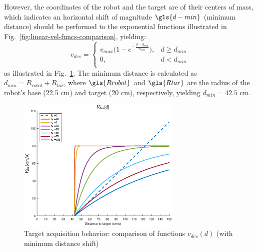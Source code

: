 However, the coordinates of the robot and the target are of their centers of
mass, which indicates an horizontal shift of magnitude $\gls{d-min}$ (minimum
distance) should be performed to the exponential functions illustrated in
Fig.~\ref{fig:linear-vel-funcs-comparison}, yielding:
\begin{equation}
  \label{eq:18} 
v_{des} = \left\{
\begin{array}{ll}
 v_{max} \Big (1 - e^{- \frac{d - d_{min}}{\tau_{vdes}}} \Big ), & d \geq d_{min} \\
      0 , & d < d_{min} \\
\end{array} 
\right.
\end{equation}
as illustrated in Fig.~\ref{fig:linear-vel-funcs-comparison-shift}.
The minimum distance is calculated as $d_{min} = R_{robot} + R_{tar}$, where
$\gls{Rrobot}$ and $\gls{Rtar}$ are the radius of the robot's base (22.5 cm) and
target (20 cm), respectively, yielding $d_{min} = 42.5$ cm.
%
\begin{figure}[!hbt]
\centering
    \includegraphics[width=0.7\textwidth]{./img/linear-vel-funcs-comparison-shift.eps}
  \caption{Target acquisition behavior: comparison of functions $v_{des} (d)$
    (with minimum distance shift)}%
\label{fig:linear-vel-funcs-comparison-shift}
\end{figure}
%

%

